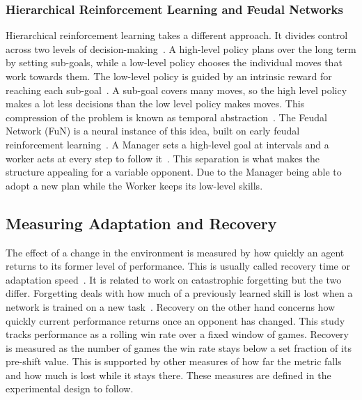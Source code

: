 \documentclass[sigconf,nonacm]{acmart}
\begin{document}
\subsubsection{Hierarchical Reinforcement Learning and Feudal Networks}
Hierarchical reinforcement learning takes a different approach. It divides control
across two levels of decision-making~\cite{pateria2021survey}. A
high-level policy plans over the long term by setting sub-goals, while a
low-level policy chooses the individual moves that work towards them. The low-level policy is
guided by an intrinsic reward for reaching each sub-goal~\cite{kulkarni2016hierarchical}.
A sub-goal covers many moves, so the high level policy makes a lot less decisions
than the low level policy makes moves. This compression of the problem is known as temporal
abstraction~\cite{sutton1999between}. The Feudal Network (FuN) is a neural
instance of this idea, built on early feudal reinforcement
learning~\cite{dayan1993feudal}. A Manager sets a high-level goal at intervals and a 
worker acts at every step to follow it~\cite{vezhnevets2017feudal}. This
separation is what makes the structure appealing for a variable opponent. Due to
the Manager being able to adopt a new plan while the Worker keeps its low-level skills.

\subsection{Measuring Adaptation and Recovery}
The effect of a change in the environment is measured by how quickly an agent returns to its former
level of performance. This is usually called recovery time or adaptation
speed~\cite{alshedivat2018continuous}. It is related to work on catastrophic
forgetting but the two differ. Forgetting deals with how much of a previously
learned skill is lost when a network is trained on a new task~\cite{kirkpatrick2017overcoming}. Recovery on the other hand concerns how quickly
current performance returns once an opponent has changed. This study tracks
performance as a rolling win rate over a fixed window of games. Recovery is
measured as the number of games the win rate stays below a set fraction of its
pre-shift value. This is supported by other measures of how far the metric falls and how much is lost while it stays there. These measures are defined in the experimental design to follow.

\end{document}
